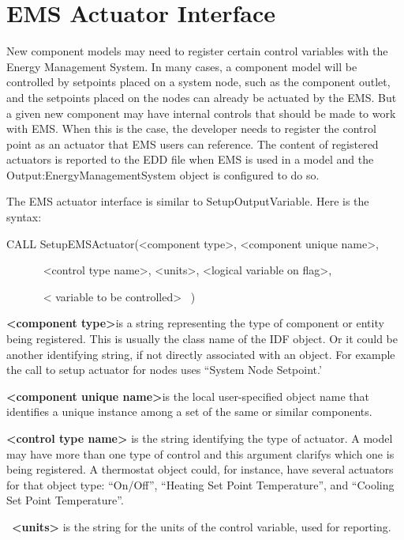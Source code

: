 \section{EMS Actuator Interface}\label{ems-actuator-interface}

New component models may need to register certain control variables with the Energy Management System. In many cases, a component model will be controlled by setpoints placed on a system node, such as the component outlet, and the setpoints placed on the nodes can already be actuated by the EMS. But a given new component may have internal controls that should be made to work with EMS. When this is the case, the developer needs to register the control point as an actuator that EMS users can reference. The content of registered actuators is reported to the EDD file when EMS is used in a model and the Output:EnergyManagementSystem object is configured to do so.

The EMS actuator interface is similar to SetupOutputVariable. Here is the syntax:

CALL SetupEMSActuator(\textless{}component type\textgreater{}, \textless{}component unique name\textgreater{},

~~~~~~ \textless{}control type name\textgreater{}, \textless{}units\textgreater{}, \textless{}logical variable on flag\textgreater{},

~~~~~~ \textless{} variable to be controlled\textgreater{}~ )

\textbf{\textless{}component type\textgreater{}}is a string representing the type of component or entity being registered. This is usually the class name of the IDF object. Or it could be another identifying string, if not directly associated with an object. For example the call to setup actuator for nodes uses ``System Node Setpoint.'

\textbf{\textless{}component unique name\textgreater{}}is the local user-specified object name that identifies a unique instance among a set of the same or similar components.

\textbf{\textless{}control type name\textgreater{}} is the string identifying the type of actuator. A model may have more than one type of control and this argument clarifys which one is being registered. A thermostat object could, for instance, have several actuators for that object type: ``On/Off'', ``Heating Set Point Temperature'', and ``Cooling Set Point Temperature''.

~\textbf{\textless{}units\textgreater{}} is the string for the units of the control variable, used for reporting.

